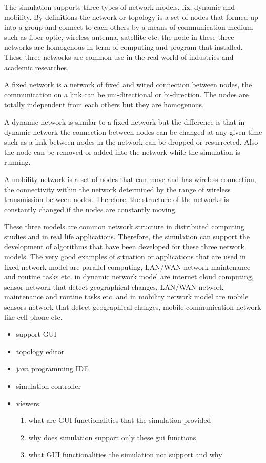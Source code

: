 The simulation supports three types of network models, fix, dynamic and mobility. By definitions the network or topology is a set of nodes that formed up into a group and connect to each others by a means of communication medium such as fiber optic, wireless antenna, satellite etc. the node in these three networks are homogenous in term of computing and program that installed. These three networks are common use in the real world of industries and academic researches.

A fixed network is a network of fixed and wired connection between nodes, the communication on a link can be uni-directional or bi-direction. The nodes are totally independent from each others but they are homogenous.

A dynamic network is similar to a fixed network but the difference is that in dynamic network the connection between nodes can be changed at any given time such as a link between nodes in the network can be dropped or resurrected. Also the node can be removed or added into the network while the simulation is running.

A mobility network is a set of nodes that can move and has wireless connection, the connectivity within the network determined by the range of wireless transmission between nodes. Therefore, the structure of the networks is constantly changed if the nodes are constantly moving.

These three models are common network structure in distributed computing studies and in real life applications. Therefore, the simulation can support the development of algorithms that have been developed for these three network models. The very good examples of situation or applications that are used in fixed network model are parallel computing, LAN/WAN network maintenance and routine tasks etc. in dynamic network model are internet cloud computing, sensor network that detect geographical changes, LAN/WAN network maintenance and routine tasks etc. and in mobility network model are mobile sensors network that detect geographical changes, mobile communication network like cell phone etc.

\begin{itemize}
\item support GUI
\item topology editor
\item java programming IDE
\item simulation controller
\item viewers
    \begin{enumerate}
    \item what are GUI functionalities that the simulation provided
    \item why does simulation support only these gui functions
    \item what GUI functionalities the simulation not support and why
    \end{enumerate}
\end{itemize}


